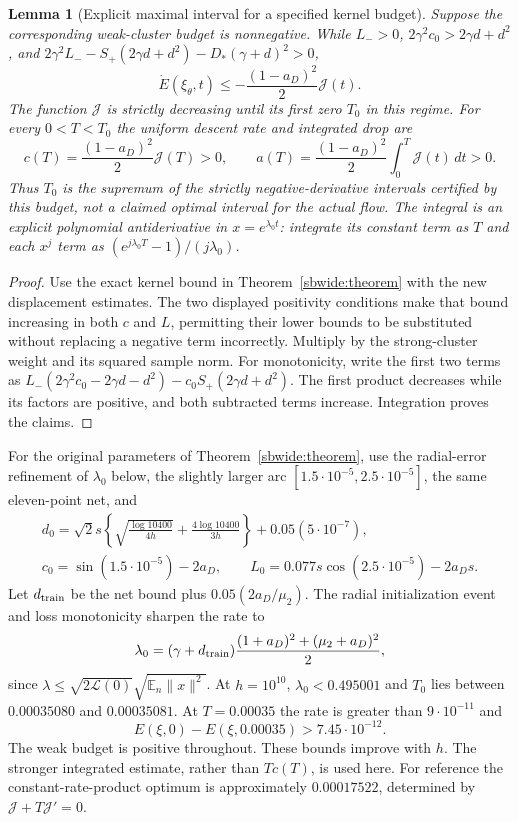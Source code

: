 \documentclass{article} %
\theoremstyle{plain}
\newtheorem{lemma}[theorem]{Lemma}
\theoremstyle{definition}
\theoremstyle{remark}
\begin{document}
\begin{lemma}[Explicit maximal interval for a specified kernel budget]
\label{sbsharp:descent}
Suppose the corresponding weak-cluster budget is nonnegative.
While $L_->0$, $2\gamma^2c_0>2\gamma d+d^2$, and
$2\gamma^2L_--S_+(2\gamma d+d^2)-D_*(\gamma+d)^2>0$,
\[
 \dot E(\xi_\theta,t)\le-\frac{(1-a_D)^2}{2}\mathcal J(t).
\]
The function $\mathcal J$ is strictly decreasing until its first zero
$T_0$ in this regime. For every $0<T<T_0$ the uniform descent rate and
integrated drop are
\[
 c(T)=\frac{(1-a_D)^2}{2}\mathcal J(T)>0,\qquad
 a(T)=\frac{(1-a_D)^2}{2}\int_0^T\mathcal J(t)\,dt>0.
\]
Thus $T_0$ is the supremum of the strictly negative-derivative intervals
certified by \emph{this budget}, not a claimed optimal interval for the
actual flow. The integral is an explicit polynomial antiderivative in
$x=e^{\lambda_0t}$: integrate its constant term as $T$ and each $x^j$
term as $(e^{j\lambda_0T}-1)/(j\lambda_0)$.
\end{lemma}
\begin{proof}
Use the exact kernel bound in Theorem~\ref{sbwide:theorem} with the
new displacement estimates. The two displayed positivity conditions
make that bound increasing in both $c$ and $L$, permitting their lower
bounds to be substituted without replacing a negative term incorrectly.
Multiply by the strong-cluster weight and its squared sample norm.
For monotonicity, write the first two terms as
$L_-(2\gamma^2c_0-2\gamma d-d^2)-c_0S_+(2\gamma d+d^2)$.
The first product decreases while its factors are positive, and both
subtracted terms increase. Integration proves the claims.
\end{proof}

For the original parameters of Theorem~\ref{sbwide:theorem}, use
the radial-error refinement of $\lambda_0$ below, the slightly larger arc
$[1.5\cdot10^{-5},2.5\cdot10^{-5}]$, the same eleven-point net, and
\begin{gather*}
 d_0=\sqrt2s\left\{\sqrt{\frac{\log10400}{4h}}
             +\frac{4\log10400}{3h}\right\}
             +0.05(5\cdot10^{-7}),\\
 c_0=\sin(1.5\cdot10^{-5})-2a_D,\qquad
 L_0=0.077s\cos(2.5\cdot10^{-5})-2a_Ds.
\end{gather*}
Let $d_{\rm train}$ be the net bound plus $0.05(2a_D/\mu_2)$.
The radial initialization event and loss monotonicity sharpen the rate to
\[
 \lambda_0=(\gamma+d_{\rm train})
        \frac{(1+a_D)^2+(\mu_2+a_D)^2}{2},
\]
since $\lambda\le\sqrt{2\mathcal L(0)}
\sqrt{\mathbb E_n\|x\|^2}$.
At $h=10^{10}$, $\lambda_0<0.495001$ and $T_0$ lies between
$0.00035080$ and $0.00035081$.
At $T=0.00035$ the rate is greater than $9\cdot10^{-11}$ and
\begin{equation}\label{sbsharp:old-drop}
 E(\xi,0)-E(\xi,0.00035)>7.45\cdot10^{-12}.
\end{equation}
The weak budget is positive throughout. These bounds improve with $h$.
The stronger integrated estimate, rather than $Tc(T)$, is used here.
For reference the constant-rate-product optimum is approximately
$0.00017522$, determined by $\mathcal J+T\mathcal J'=0$.
\end{document}
